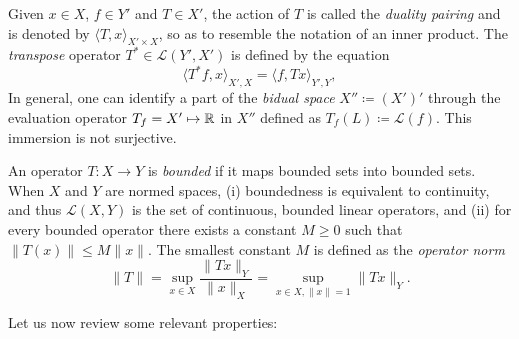 \begin{definition}
    Given $x\in X$, $f\in Y'$ and $T\in X'$, the action of $T$ is called the \emph{duality pairing} and is denoted by $\langle T, x\rangle_{X'\times X}$, so as to resemble the notation of an inner product. The \emph{transpose} operator $T^*\in \mathcal{L}(Y',X')$ is defined by the equation 
    \begin{equation}
        \langle T^* f, x\rangle_{X',X} = \langle f, Tx\rangle_{Y',Y},
    \end{equation}
    In general, one can identify a part of the \emph{bidual space} $X'' \coloneqq (X')'$ through the evaluation operator $T_f = X'\mapsto \mathbb{R}$ in $X''$ defined as $T_f(L) \coloneqq \mathcal{L}(f)$. This immersion is not surjective. 
\end{definition}
\begin{definition}\label{def:bounded-operator}
    An operator $T:X\to Y$ is \emph{bounded} if it maps bounded sets into bounded sets. When $X$ and $Y$ are normed spaces, (i) boundedness is equivalent to continuity, and thus $\mathcal{L}(X,Y)$ is the set of continuous, bounded linear operators, and (ii) for every bounded operator there exists a constant $M\geq 0$ such that $\|T(x)\|\leq M\|x\|$. The smallest constant $M$ is defined as the \emph{operator norm}
    \begin{equation}\label{eq:operator-norm}
        \| T\| =  \sup_{x\in X}\frac{\|Tx\|_Y}{\|x\|_X} = \sup_{x\in X,\|x\|=1}\|Tx\|_Y.
    \end{equation}
\end{definition}
Let us now review some relevant properties: 
